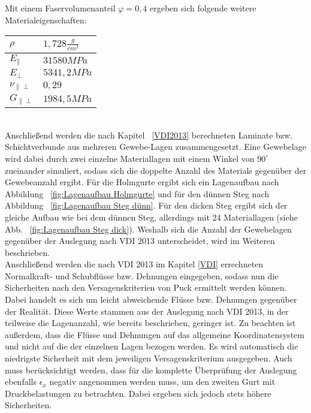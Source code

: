 \noindent Mit einem Faservolumenanteil $\varphi=0,4$ ergeben sich folgende weitere Materialeigenschaften:\\

\begin{tabular}{ll}
	$\rho$ & $1,728 \frac{g}{cm^{3}}$ \\
	\hline
	$E_{\parallel}$ & $31580 MPa$\\
	\hline
	$E_{\perp}$ & $5341,2MPa$\\
	\hline
	$\nu_{\parallel\perp}$ & $0,29$\\
	\hline
	$G_{\parallel\perp}$ & $1984,5 MPa$\\
\end{tabular}\\

\noindent Anschließend werden die nach Kapitel ~\ref{VDI2013} berechneten Laminate bzw. Schichtverbunde aus mehreren Gewebe-Lagen zusammengesetzt. Eine Gewebelage wird dabei durch zwei einzelne Materiallagen mit einem Winkel von $90^{\circ}$ zueinander simuliert, sodass sich die doppelte Anzahl des Materials gegenüber der Gewebeanzahl ergibt. Für die Holmgurte ergibt sich ein Lagenaufbau nach Abbildung ~\ref{fig:Lagenaufbau Holmgurte} und für den dünnen Steg nach Abbildung ~\ref{fig:Lagenaufbau Steg dünn}. Für den dicken Steg ergibt sich der gleiche Aufbau wie bei dem dünnen Steg, allerdings mit 24 Materiallagen (siehe Abb. ~\ref{fig:Lagenaufbau Steg dick}). Weshalb sich die Anzahl der Gewebelagen gegenüber der Auslegung nach VDI 2013 unterscheidet, wird im Weiteren beschrieben.\\ 

\noindent Anschließend werden die nach VDI 2013 im Kapitel \ref{VDI} errechneten Normalkraft- und Schubflüsse bzw. Dehnungen eingegeben, sodass nun die Sicherheiten nach den Versagenskriterien von Puck ermittelt werden können. Dabei handelt es sich um leicht abweichende Flüsse bzw. Dehnungen gegenüber der Realität. Diese Werte stammen aus der Auslegung nach VDI 2013, in der teilweise die Lagenanzahl, wie bereits beschrieben, geringer ist. Zu beachten ist außerdem, dass die Flüsse und Dehnungen auf das allgemeine Koordinatensystem und nicht auf die der einzelnen Lagen bezogen werden. Es wird automatisch die niedrigste Sicherheit mit dem jeweiligen Versagenskriterium ausgegeben. Auch muss berücksichtigt werden, dass für die komplette Überprüfung der Auslegung ebenfalls $\epsilon_{x}$ negativ angenommen werden muss, um den zweiten Gurt mit Druckbelastungen zu betrachten. Dabei ergeben sich jedoch stets höhere Sicherheiten.\\

